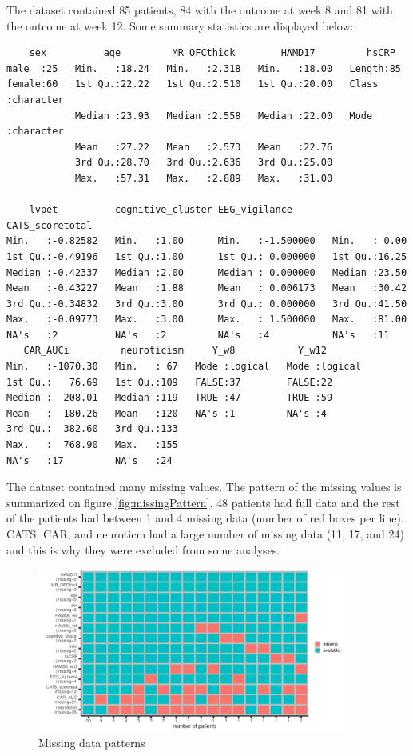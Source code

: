\documentclass[12pt]{article}
\begin{document}
The dataset contained 85 patients, 84 with the outcome at week 8 and
81 with the outcome at week 12. Some summary statistics are displayed
below:
\begin{verbatim}
    sex          age         MR_OFCthick        HAMD17         hsCRP          
male  :25   Min.   :18.24   Min.   :2.318   Min.   :18.00   Length:85         
female:60   1st Qu.:22.22   1st Qu.:2.510   1st Qu.:20.00   Class :character  
            Median :23.93   Median :2.558   Median :22.00   Mode  :character  
            Mean   :27.22   Mean   :2.573   Mean   :22.76                     
            3rd Qu.:28.70   3rd Qu.:2.636   3rd Qu.:25.00                     
            Max.   :57.31   Max.   :2.889   Max.   :31.00                     

    lvpet          cognitive_cluster EEG_vigilance       CATS_scoretotal
Min.   :-0.82582   Min.   :1.00      Min.   :-1.500000   Min.   : 0.00  
1st Qu.:-0.49196   1st Qu.:1.00      1st Qu.: 0.000000   1st Qu.:16.25  
Median :-0.42337   Median :2.00      Median : 0.000000   Median :23.50  
Mean   :-0.43227   Mean   :1.88      Mean   : 0.006173   Mean   :30.42  
3rd Qu.:-0.34832   3rd Qu.:3.00      3rd Qu.: 0.000000   3rd Qu.:41.50  
Max.   :-0.09773   Max.   :3.00      Max.   : 1.500000   Max.   :81.00  
NA's   :2          NA's   :2         NA's   :4           NA's   :11     
   CAR_AUCi         neuroticism     Y_w8           Y_w12        
Min.   :-1070.30   Min.   : 67   Mode :logical   Mode :logical  
1st Qu.:   76.69   1st Qu.:109   FALSE:37        FALSE:22       
Median :  208.01   Median :119   TRUE :47        TRUE :59       
Mean   :  180.26   Mean   :120   NA's :1         NA's :4        
3rd Qu.:  382.60   3rd Qu.:133                                  
Max.   :  768.90   Max.   :155                                  
NA's   :17         NA's   :24
\end{verbatim}

The dataset contained many missing values. The pattern of the missing
values is summarized on figure \autoref{fig:missingPattern}. 48 patients
had full data and the rest of the patients had between 1 and 4 missing
data (number of red boxes per line). CATS, CAR, and neuroticm had a
large number of missing data (11, 17, and 24) and this is why they
were excluded from some analyses.

\clearpage

\begin{figure}[!h]
\centering
\includegraphics[trim={0 0 0 0},width=0.9\textwidth]{./figures/gg-missingPattern.pdf}
\caption{\label{fig:missingPattern}Missing data patterns}
\end{figure}
\end{document}
